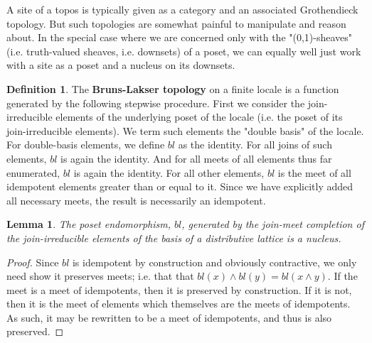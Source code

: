 \documentclass[hoptionsi,review,format=acmsmall]{acmart}
\newtheorem{lemma}[theorem]{Lemma}
\theoremstyle{definition}
\newtheorem{definition}{Definition}[section]
\begin{document}
A site of a topos is typically given as a category and an associated Grothendieck topology. But such topologies are somewhat painful to manipulate and reason about. In the special case where we are concerned only with the "(0,1)-sheaves" (i.e. truth-valued sheaves, i.e. downsets) of a poset, we can equally well just work with a site as a poset and a nucleus on its downsets.

\begin{definition}
The \textbf{Bruns-Lakser topology} on a finite locale is a function generated by the following stepwise procedure. First we consider the join-irreducible elements of the underlying poset of the locale (i.e. the poset of its join-irreducible elements). We term such elements the "double basis" of the locale. For double-basis elements, we define \(bl\) as the identity. For all joins of such elements, \(bl\) is again the identity. And for all meets of all elements thus far enumerated, \(bl\) is again the identity. For all other elements, \(bl\) is the meet of all idempotent elements greater than or equal to it. Since we have explicitly added all necessary meets, the result is necessarily an idempotent.
\end{definition}

\begin{lemma}
The poset endomorphism, \(bl\), generated by the join-meet completion of the join-irreducible elements of the basis of a distributive lattice is a nucleus.
\end{lemma}
\begin{proof}
Since \(bl\) is idempotent by construction and obviously contractive, we only need show it preserves meets; i.e. that that \(bl(x) \wedge bl(y) = bl(x  \wedge  y)\).  If the meet is a meet of idempotents, then it is preserved by construction. If it is not, then it is the meet of elements which themselves are the meets of idempotents. As such, it may be rewritten to be a meet of idempotents, and thus is also preserved.
\end{proof}

\end{document}
